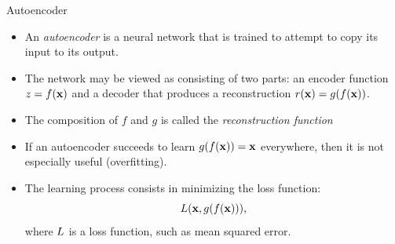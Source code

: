 \documentclass[handout,xcolor=pdftex,dvipsnames,table,mathserif]{beamer}
\begin{document}
\begin{frame}{Autoencoder}
\begin{itemize}
\item An \emph{autoencoder} is a neural network that is trained to attempt to copy its input to its output.
\item The network may be viewed as consisting of two parts: an
encoder function $z = f (\mathbf{x})$ and a decoder that produces a reconstruction $r(\mathbf{x}) = g(f(\mathbf{x}))$.
\item The composition of $f$ and $g$ is called the \emph{reconstruction function}
\item If an autoencoder succeeds to learn $g(f (\mathbf{x})) = \mathbf{x}$ everywhere, then it is not especially useful (overfitting).
\item The learning process consists in minimizing the loss function:
\begin{equation}
L ( \mathbf{x} , g(f(\mathbf{x}))),
\end{equation}
where $L$ is a loss function, such as mean squared error.
\end{itemize}
\begin{figure}
\centering
{}
\end{figure}
\end{frame}
\end{document}
